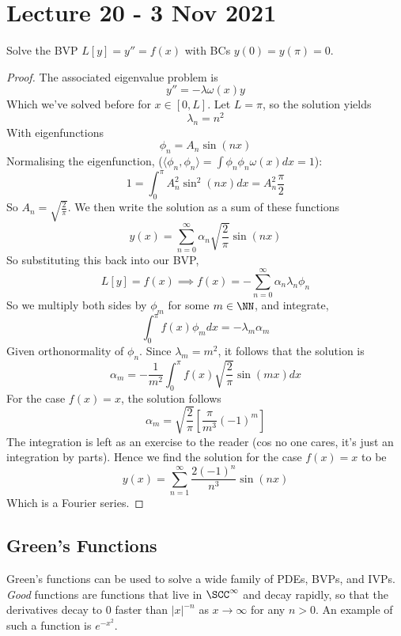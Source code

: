 \section{Lecture 20 - 3 Nov 2021}
\begin{example}
  Solve the BVP $L[y]=y''=f(x)$ with BCs $y(0)=y(\pi)=0$.
\end{example}
\begin{proof}
  The associated eigenvalue problem is 
  \[y''=-\lambda\omega(x)y\]
  Which we've solved before for $x\in[0,L]$. Let $L=\pi$, so the solution yields
  \[\lambda_n=n^2\]
  With eigenfunctions
  \[\phi_n = A_n\sin(nx)\]
  Normalising the eigenfunction, ($\langle \phi_n,\phi_n \rangle =\int \phi_n\phi_n
  \omega(x)dx=1$):
  \[1=\int_{0}^{\pi} A_n^2 \sin^2(nx) dx = A_n^2\frac{\pi}{2} \]
  So $A_n= \sqrt{\frac{2}{\pi}}$. We then write the solution as a sum of these functions
  \[y(x)=\sum_{n=0}^{\infty} \alpha_n \sqrt{\frac{2}{\pi}}\sin(nx)\]
  So substituting this back into our BVP,
  \[L[y]=f(x) \implies f(x)= -\sum_{n=0}^{\infty} \alpha_n\lambda_n\phi_n \]
  So we multiply both sides by $\phi_m$ for some $m\in\NN$, and integrate,
  \[\int_{0}^{\pi} f(x)\phi_m dx = -\lambda_m \alpha_m\]
  Given orthonormality of $\phi_n$. Since $\lambda_m=m^2$, it follows that the solution is
  \[\alpha_m= -\frac{1}{m^2} \int_{0}^{\pi} f(x) \sqrt{\frac{2}{\pi}}\sin(mx) dx\]
  For the case $f(x)=x$, the solution follows
  \[\alpha_m= \sqrt{\frac{2}{\pi}} \left[ \frac{\pi}{m^3} (-1)^m \right]\]
  The integration is left as an exercise to the reader (cos no one cares, it's just an
  integration by parts). Hence we find the solution for the case $f(x)=x$ to be 
  \[y(x)= \sum_{n=1}^{\infty} \frac{2(-1)^n}{n^3} \sin(nx)\]
  Which is a Fourier series.
\end{proof}

\subsection{Green's Functions}
Green's functions can be used to solve a wide family of PDEs, BVPs, and IVPs.
\emph{Good} functions are functions that live in $\SCC^{\infty}$ and decay rapidly, so
that the derivatives decay to $0$ faster than $|x|^{-n}$ as $x\to\infty$ for any $n>0$. An
example of such a function is $e^{-x^2}$.

